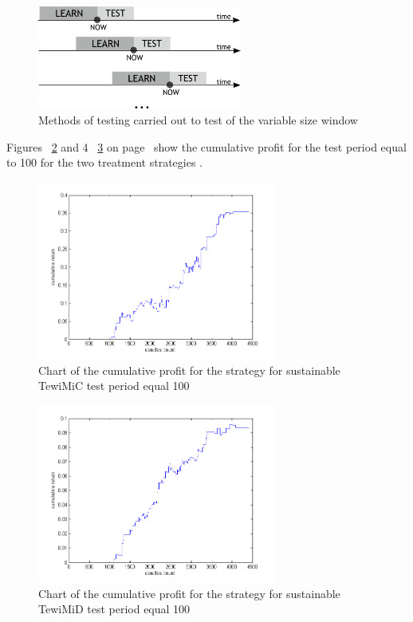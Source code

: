 \documentclass{tewiart}
\begin{document}
\begin{figure}[h!]
\begin{center}
\includegraphics[width=0.6\textwidth]{pictures/metodyka_badan.png}
\caption{Methods of testing carried out to test of the variable size window}
\label{metodyka}
\end{center}
\end{figure}
\FloatBarrier

Figures ~\ref{MiC100} and 4 ~\ref{MiD100} on page ~\pageref{MiD100}show the cumulative profit for the test period equal to 100 for the two treatment strategies .

\begin{figure}[h!]
\begin{center}
\includegraphics[width=0.7\textwidth]{pictures/mic_100.png}
\caption{Chart of the cumulative profit for the strategy for sustainable TewiMiC test period equal 100}
\label{MiC100}
\end{center}
\end{figure}
\FloatBarrier

\begin{figure}[h!]
\begin{center}
\includegraphics[width=0.7\textwidth]{pictures/mid_100.png}
\caption{Chart of the cumulative profit for the strategy for sustainable TewiMiD test period equal 100}
\label{MiD100}
\end{center}
\end{figure}
\FloatBarrier
\end{document}
